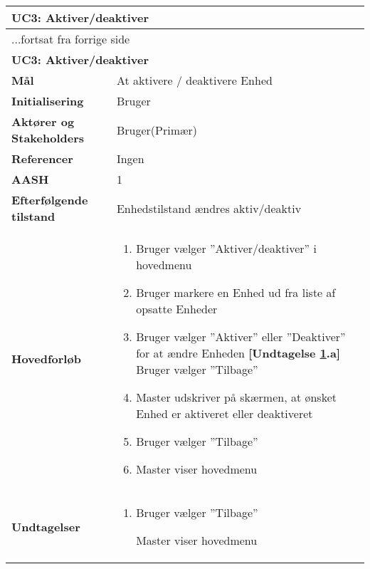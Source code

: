 \begin{center} \centering \label{UC3} 
	\begin{longtable}{|p{5cm}|p{9cm}|}  %
	\hline
		\multicolumn{2}{|l|}{\textbf{UC3: Aktiver/deaktiver}} \\\hline %
		\endfirsthead
		
		\multicolumn{2}{l}{...fortsat fra forrige side} \\ \hline %
		\multicolumn{2}{|l|}{\textbf{UC3: Aktiver/deaktiver}} \\\hline %
		\endhead	
		
		\textbf{Mål}								&At aktivere / deaktivere Enhed	\\\hline
		\textbf{Initialisering}					&Bruger				\\\hline
		\textbf{Aktører og Stakeholders}			&Bruger(Primær)		\\\hline
		\textbf{Referencer}						&Ingen				\\\hline
		\textbf{AASH}							&1					\\\hline
		\textbf{Efterfølgende tilstand}			&Enhedstilstand ændres aktiv/deaktiv\\\hline
		\textbf{Hovedforløb}					
			&\begin{enumerate}
	
	
				\item Bruger vælger ''Aktiver/deaktiver'' i hovedmenu
				
				\item Bruger markere en Enhed ud fra liste af opsatte Enheder
				
				\item \label{uc3aktiver} Bruger vælger ''Aktiver'' eller ''Deaktiver'' for at ændre Enheden\newline
				\textbf{[Undtagelse \ref{uc3aktiver}.a]} \newline
				Bruger vælger ''Tilbage''
				
				\item Master udskriver på skærmen, at ønsket Enhed er aktiveret eller deaktiveret		
			
				\item Bruger vælger ''Tilbage''
				
				\item Master viser hovedmenu	
	
			\end{enumerate}\\\hline
			
		\textbf{Undtagelser}
			&\begin{enumerate}[label=\ref{uc3aktiver}.a]
				
				\item Bruger vælger ''Tilbage''
				
					\subitem Master viser hovedmenu
			\end{enumerate}\\\hline			
			
	\end{longtable}
\end{center}

